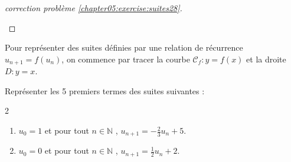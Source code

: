 \documentclass[main.tex]{subfiles}
\begin{document}
\begin{proof}[correction problème \ref{chapter05:exercise:suites28}]
\begin{enumerate}[label=\arabic*),leftmargin=*]
\end{enumerate}
\end{proof}
%
\begin{eBox} Pour représenter des suites définies par  une relation de récurrence $u_{n+1}=f(u_n)$, on commence par tracer la courbe $\mathscr{C}_f\colon y=f(x)$ et la droite $D\colon y= x$.
\end{eBox}
\begin{example} 	Représenter les 5 premiers termes des suites suivantes :
\vspace{-0.5em}
\begin{multicols}{2}
\begin{enumerate}[label=\arabic*),leftmargin=*] 
	\item  $u_0=1$ et pour tout $n\in\mathbb{N}$ , $u_{n+1}=-\tfrac{2}{3}u_n+5$.
	\item  $u_0=0$ et pour tout $n\in\mathbb{N}$ , $u_{n+1}= \tfrac{1}{2}u_n+2$.
\end{enumerate}
\end{multicols}
\end{example}
\noindent
\end{document}
